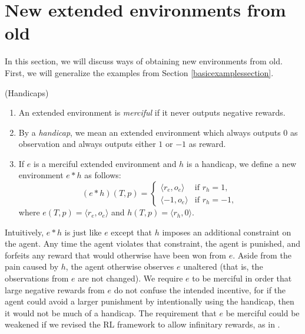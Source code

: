 \documentclass[runningheads]{llncs}
\begin{document}
\section{New extended environments from old}
\label{newextendedenvironmentsfromoldsecn}

In this section, we will discuss ways of obtaining new environments from old.
First, we will generalize the examples from Section \ref{basicexamplessection}.

\begin{definition}
    (Handicaps)
    \begin{enumerate}
        \item
        An extended environment is \emph{merciful} if it never outputs negative rewards.
        \item
        By a \emph{handicap}, we mean an extended environment which always outputs $0$ as
        observation and always outputs either $1$ or $-1$ as reward.
        \item
        If $e$ is a merciful extended environment and $h$ is a handicap,
        we define a new environment $e*h$ as follows:
        \[
            (e*h)(T,p) =
            \begin{cases}
                \langle r_e, o_e\rangle &\mbox{if $r_h=1$},\\
                \langle -1, o_e\rangle &\mbox{if $r_h=-1$},
            \end{cases}
        \]
        where $e(T,p)=\langle r_e,o_e\rangle$ and $h(T,p)=\langle r_h,0\rangle$.
    \end{enumerate}
\end{definition}

Intuitively, $e*h$ is just like $e$ except that $h$ imposes an additional constraint
on the agent. Any time the agent violates that constraint, the agent is punished,
and forfeits any reward that would otherwise have been won from $e$. Aside from the
pain caused by $h$, the agent otherwise observes $e$ unaltered (that is, the observations
from $e$ are not changed). We require $e$ to be merciful in order that large negative
rewards from $e$ do not confuse the intended incentive, for if the agent could avoid
a larger punishment by intentionally using the handicap, then it would not
be much of a handicap. The requirement that $e$ be
merciful could be weakened if we revised the RL framework
to allow infinitary rewards, as in \cite{alexander2020archimedean}.
\end{document}
